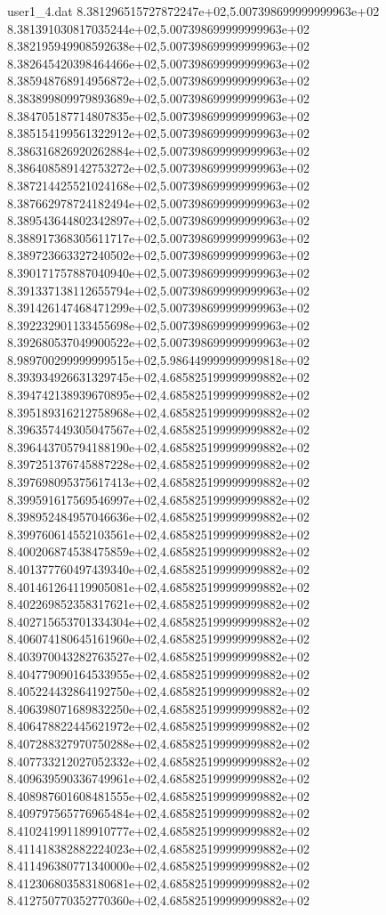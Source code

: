 \begin{filecontents}{user1_4.dat}
8.381296515727872247e+02,5.007398699999999963e+02
8.381391030817035244e+02,5.007398699999999963e+02
8.382195949908592638e+02,5.007398699999999963e+02
8.382645420398464466e+02,5.007398699999999963e+02
8.385948768914956872e+02,5.007398699999999963e+02
8.383899809979893689e+02,5.007398699999999963e+02
8.384705187714807835e+02,5.007398699999999963e+02
8.385154199561322912e+02,5.007398699999999963e+02
8.386316826920262884e+02,5.007398699999999963e+02
8.386408589142753272e+02,5.007398699999999963e+02
8.387214425521024168e+02,5.007398699999999963e+02
8.387662978724182494e+02,5.007398699999999963e+02
8.389543644802342897e+02,5.007398699999999963e+02
8.388917368305611717e+02,5.007398699999999963e+02
8.389723663327240502e+02,5.007398699999999963e+02
8.390171757887040940e+02,5.007398699999999963e+02
8.391337138112655794e+02,5.007398699999999963e+02
8.391426147468471299e+02,5.007398699999999963e+02
8.392232901133455698e+02,5.007398699999999963e+02
8.392680537049900522e+02,5.007398699999999963e+02
8.989700299999999515e+02,5.986449999999999818e+02
8.393934926631329745e+02,4.685825199999999882e+02
8.394742138939670895e+02,4.685825199999999882e+02
8.395189316212758968e+02,4.685825199999999882e+02
8.396357449305047567e+02,4.685825199999999882e+02
8.396443705794188190e+02,4.685825199999999882e+02
8.397251376745887228e+02,4.685825199999999882e+02
8.397698095375617413e+02,4.685825199999999882e+02
8.399591617569546997e+02,4.685825199999999882e+02
8.398952484957046636e+02,4.685825199999999882e+02
8.399760614552103561e+02,4.685825199999999882e+02
8.400206874538475859e+02,4.685825199999999882e+02
8.401377760497439340e+02,4.685825199999999882e+02
8.401461264119905081e+02,4.685825199999999882e+02
8.402269852358317621e+02,4.685825199999999882e+02
8.402715653701334304e+02,4.685825199999999882e+02
8.406074180645161960e+02,4.685825199999999882e+02
8.403970043282763527e+02,4.685825199999999882e+02
8.404779090164533955e+02,4.685825199999999882e+02
8.405224432864192750e+02,4.685825199999999882e+02
8.406398071689832250e+02,4.685825199999999882e+02
8.406478822445621972e+02,4.685825199999999882e+02
8.407288327970750288e+02,4.685825199999999882e+02
8.407733212027052332e+02,4.685825199999999882e+02
8.409639590336749961e+02,4.685825199999999882e+02
8.408987601608481555e+02,4.685825199999999882e+02
8.409797565776965484e+02,4.685825199999999882e+02
8.410241991189910777e+02,4.685825199999999882e+02
8.411418382882224023e+02,4.685825199999999882e+02
8.411496380771340000e+02,4.685825199999999882e+02
8.412306803583180681e+02,4.685825199999999882e+02
8.412750770352770360e+02,4.685825199999999882e+02

\end{filecontents}
